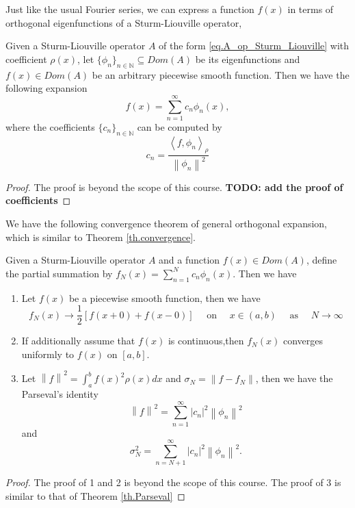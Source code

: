 Just like the usual Fourier series, we can express a function $f(x)$ in terms of orthogonal eigenfunctions of a Sturm-Liouville operator,
\begin{theorem}
    Given a Sturm-Liouville operator $A$ of the form \eqref{eq.A_op_Sturm_Liouville} with coefficient $\rho(x)$, let $\{\phi_n\}_{n\in \mathbb{N}}\subseteq \textit{Dom}(A)$ be its eigenfunctions and $f(x)\in \textit{Dom}(A)$ be an arbitrary piecewise smooth function. Then we have the following expansion
    \begin{equation}\label{eq.general_Fourier}
        f(x) =\sum_{n=1}^\infty c_n \phi_n(x),
    \end{equation}
    where the coefficients $\{c_n\}_{n\in \mathbb{N}}$ can be computed by
    \begin{equation}\label{eq.general_Fourier_coef}
        c_n=\frac{\left\langle f, \phi_n\right\rangle_\rho}{\left\|\phi_n\right\|^2}
    \end{equation}
\end{theorem}
\begin{proof}
    The proof is beyond the scope of this course. \textbf{TODO: add the proof of coefficients}
\end{proof}

We have the following convergence theorem of general orthogonal expansion, which is similar to Theorem \ref{th.convergence}.
\begin{theorem}[Convergence]
Given a Sturm-Liouville operator $A$ and a function $f(x)\in \textit{Dom}(A)$, define the partial summation by $f_N(x)=\sum_{n=1}^N c_n \phi_n(x)$. Then we have
\begin{enumerate}
    \item Let $f(x)$ be a piecewise smooth function, then we have 
    \begin{equation}
        f_N(x) \rightarrow \frac{1}{2}[f(x+0)+f(x-0)] \quad \text { on } \quad x \in(a, b) \quad \text { as } \quad N \rightarrow \infty
    \end{equation}
    \item If additionally assume that $f(x)$ is continuous,then $f_N(x)$ converges uniformly to $f(x)$ on $[a, b]$.    
    \item Let $\left\|f\right\|^2 = \int_a^b f(x)^2 \rho(x) d x$ and $\sigma_N = \left\|f - f_N\right\|$, then we have the Parseval's identity
    \begin{equation}\label{eq.Parseval_general}
        \left\|f\right\|^2 = \sum_{n=1}^\infty |c_n|^2\left\|\phi_n\right\|^2
    \end{equation}
    and
    \begin{equation}\label{eq.mean_square_error_Parseval_general}
        \sigma_N^2 = \sum_{n= N+1}^\infty |c_n|^2\left\|\phi_n\right\|^2.
    \end{equation}
\end{enumerate}
\end{theorem}
\begin{proof}
    The proof of 1 and 2 is beyond the scope of this course. The proof of 3 is similar to that of Theorem \ref{th.Parseval}
\end{proof}